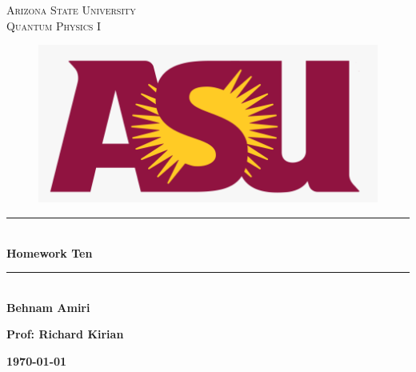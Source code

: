\documentclass[fleqn]{article}
\begin{document}
  \begin{titlepage}

    \newcommand{\HRule}{\rule{\linewidth}{0.5mm}}

    \center


    \textsc{\LARGE Arizona State University}\\[1.5cm]

    \textsc{\LARGE Quantum Physics I }\\[1.5cm]


    \begin{figure}
      \includegraphics[width=\linewidth]{asu.png}
    \end{figure}


    \HRule \\[0.4cm]
    { \huge \bfseries Homework Ten}\\[0.4cm] 
    \HRule \\[1.5cm]

    \textbf{Behnam Amiri}

    \bigbreak

    \textbf{Prof: Richard Kirian}

    \bigbreak


    \textbf{{\large \today}\\[2cm]}

    \vfill 

  \end{titlepage}
\end{document}
